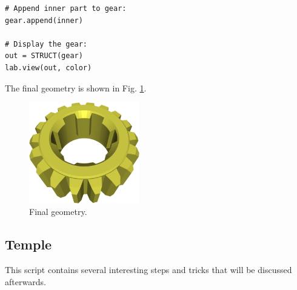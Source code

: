 {\small
\begin{bbox}
\begin{verbatim}
# Append inner part to gear:
gear.append(inner)

# Display the gear:
out = STRUCT(gear)
lab.view(out, color)
\end{verbatim}
\end{bbox}
}
\vspace{6mm}

\noindent
The final geometry is shown in Fig. \ref{fig:gear-last}.

\begin{figure}[!ht]
\begin{center}
\includegraphics[width=0.43\textwidth]{img/gear-last.png}
\end{center}
\vspace{-4mm}
\caption{Final geometry.}
\label{fig:gear-last}
\end{figure}
\noindent


\subsection{Temple}

This script contains several interesting steps and tricks that will 
be discussed afterwards.\\

